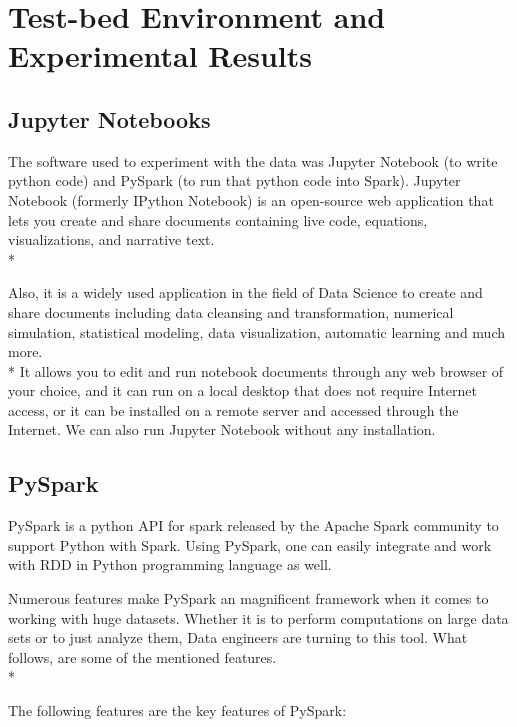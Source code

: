 \section{Test-bed Environment and Experimental Results}
\label{sec:experiments}

\subsection{Jupyter Notebooks \cite{Jupyter}}

The software used to experiment with the data was Jupyter Notebook (to write python code) and PySpark (to run that python code into Spark).
Jupyter Notebook (formerly IPython Notebook) is an open-source web application that lets you create and share documents containing live code, equations, visualizations, and narrative text.\\*

Also, it is a widely used application in the field of Data Science to create and share documents including data cleansing and transformation, numerical simulation, statistical modeling, data visualization, automatic learning and much more.\\*
It allows you to edit and run notebook documents through any web browser of your choice, and it can run on a local desktop that does not require Internet access, or it can be installed on a remote server and accessed through the Internet. We can also run Jupyter Notebook without any installation.

\subsection{PySpark \cite{pySpark}}
PySpark is a python API for spark released by the Apache Spark community to support Python with Spark. Using PySpark, one can easily integrate and work with RDD in Python programming language as well. 

Numerous features make PySpark an magnificent framework when it comes to working with huge datasets. Whether it is to perform computations on large data sets or to just analyze them, Data engineers are turning to this tool. What follows, are some of the mentioned features.\\*

\noindent
The following features are the key features of PySpark:

